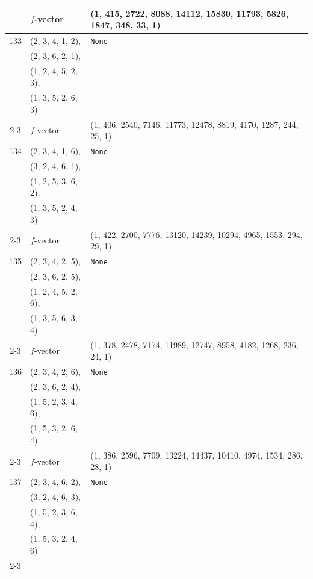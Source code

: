 \documentclass[10pt]{amsart}
\numberwithin{equation}{section}
\theoremstyle{plain}
\theoremstyle{definition}
\theoremstyle{remark}
\begin{document}
{\begin{longtable}{c|l|l}
		& $f$-vector & {(1, 415, 2722, 8088, 14112, 15830, 11793, 5826, 1847, 348, 33, 1)} \\
		\midrule
		
		133 & (2, 3, 4, 1, 2), & \texttt{None} \\
		& (2, 3, 6, 2, 1), &  \\
		& (1, 2, 4, 5, 2, 3), &  \\
		& (1, 3, 5, 2, 6, 3) &  \\ \cline{2-3}
		
		& $f$-vector & {(1, 406, 2540, 7146, 11773, 12478, 8819, 4170, 1287, 244, 25, 1)} \\
		\midrule
		
		134 & (2, 3, 4, 1, 6), & \texttt{None} \\
		& (3, 2, 4, 6, 1), &  \\
		& (1, 2, 5, 3, 6, 2), &  \\
		& (1, 3, 5, 2, 4, 3) &  \\ \cline{2-3}
		
		& $f$-vector & {(1, 422, 2700, 7776, 13120, 14239, 10294, 4965, 1553, 294, 29, 1)} \\
		\midrule
		
		135 & (2, 3, 4, 2, 5), & \texttt{None} \\
		& (2, 3, 6, 2, 5), &  \\
		& (1, 2, 4, 5, 2, 6), &  \\
		& (1, 3, 5, 6, 3, 4) &  \\ \cline{2-3}
		
		& $f$-vector & {(1, 378, 2478, 7174, 11989, 12747, 8958, 4182, 1268, 236, 24, 1)} \\
		\midrule
		
		136 & (2, 3, 4, 2, 6), & \texttt{None} \\
		& (2, 3, 6, 2, 4), &  \\
		& (1, 5, 2, 3, 4, 6), &  \\
		& (1, 5, 3, 2, 6, 4) &  \\ \cline{2-3}
		
		& $f$-vector & {(1, 386, 2596, 7709, 13224, 14437, 10410, 4974, 1534, 286, 28, 1)} \\
		\midrule
		
		137 & (2, 3, 4, 6, 2), & \texttt{None} \\
		& (3, 2, 4, 6, 3), &  \\
		& (1, 5, 2, 3, 6, 4), &  \\
		& (1, 5, 3, 2, 4, 6) &  \\ \cline{2-3}
		

\end{longtable}}
\end{document}
